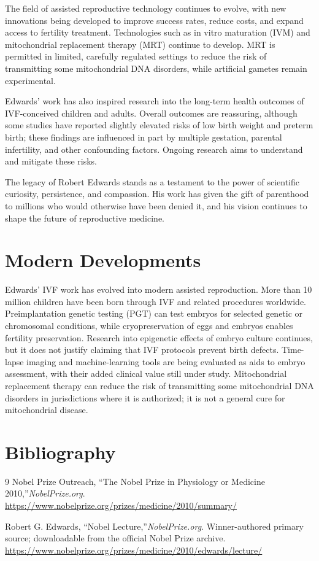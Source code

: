 The field of assisted reproductive technology continues to evolve, with new innovations being developed to improve success rates, reduce costs, and expand access to fertility treatment. Technologies such as in vitro maturation (IVM) and mitochondrial replacement therapy (MRT) continue to develop. MRT is permitted in limited, carefully regulated settings to reduce the risk of transmitting some mitochondrial DNA disorders, while artificial gametes remain experimental.

Edwards' work has also inspired research into the long-term health outcomes of IVF-conceived children and adults. Overall outcomes are reassuring, although some studies have reported slightly elevated risks of low birth weight and preterm birth; these findings are influenced in part by multiple gestation, parental infertility, and other confounding factors. Ongoing research aims to understand and mitigate these risks.

The legacy of Robert Edwards stands as a testament to the power of scientific curiosity, persistence, and compassion. His work has given the gift of parenthood to millions who would otherwise have been denied it, and his vision continues to shape the future of reproductive medicine.


\section{Modern Developments}

Edwards' IVF work has evolved into modern assisted reproduction. More than 10 million children have been born through IVF and related procedures worldwide. Preimplantation genetic testing (PGT) can test embryos for selected genetic or chromosomal conditions, while cryopreservation of eggs and embryos enables fertility preservation. Research into epigenetic effects of embryo culture continues, but it does not justify claiming that IVF protocols prevent birth defects. Time-lapse imaging and machine-learning tools are being evaluated as aids to embryo assessment, with their added clinical value still under study. Mitochondrial replacement therapy can reduce the risk of transmitting some mitochondrial DNA disorders in jurisdictions where it is authorized; it is not a general cure for mitochondrial disease.


\section{Bibliography}

\begin{thebibliography}{9}
Nobel Prize Outreach, ``The Nobel Prize in Physiology or Medicine 2010,''\emph{NobelPrize.org}.\\
\url{https://www.nobelprize.org/prizes/medicine/2010/summary/}

Robert G. Edwards, ``Nobel Lecture,''\emph{NobelPrize.org}. Winner-authored primary source; downloadable from the official Nobel Prize archive.\\
\url{https://www.nobelprize.org/prizes/medicine/2010/edwards/lecture/}
\end{thebibliography}
